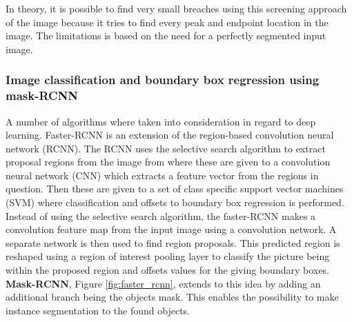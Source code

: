 \documentclass[../Head/Main.tex]{subfiles}
\begin{document}
In theory, it is possible to find very small breaches using this screening approach of the image because it tries to find every peak and endpoint location in the image. The limitations is based on the need for a perfectly segmented input image.  

\subsubsection{Image classification and boundary box regression using mask-RCNN}
\label{subsec:deep_learning_cnn}

A number of algorithms where taken into consideration in regard to deep learning. Faster-RCNN is an extension of the region-based convolution neural network (RCNN). The RCNN uses the selective search algorithm to extract proposal regions from the image from where these are given to a convolution neural network (CNN) which extracts a feature vector from the regions in question. Then these are given to a set of class specific support vector machines (SVM) where classification and offsets to boundary box regression is performed. Instead of using the selective search algorithm, the faster-RCNN makes a convolution feature map from the input image using a convolution network. A separate network is then used to find region proposals. This predicted region is reshaped using a region of interest pooling layer to classify the picture being within the proposed region and offsets values for the giving boundary boxes. \textbf{Mask-RCNN}, Figure \ref{fig:faster_rcnn}, extends to this idea by adding an additional branch being the objects mask. This enables the possibility to make instance segmentation to the found objects.\cite{FasterRCNN} \cite{MaskRCNN} \cite{prosConsDeepLearning}
\end{document}
